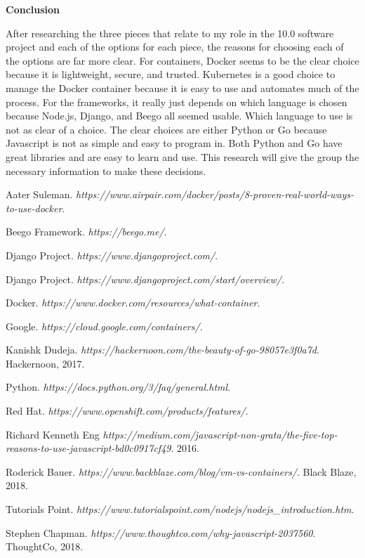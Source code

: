 \documentclass[letterpaper,10pt,draftclsnofoot,onecolumn,]{IEEEtran}
\begin{document}
\begin{center}
\textbf{Conclusion}\\
\end{center}
After researching the three pieces that relate to my role in the 10.0 software project and each of the options for each piece, the reasons for choosing each of the options are far more clear. For containers, Docker seems to be the clear choice because it is lightweight, secure, and trusted. Kubernetes is a good choice to manage the Docker container because it is easy to use and automates much of the process. For the frameworks, it really just depends on which language is chosen because Node.js, Django, and Beego all seemed usable. Which language to use is not as clear of a choice. The clear choices are either Python or Go because Javascript is not as simple and easy to program in. Both Python and Go have great libraries and are easy to learn and use. This research will give the group the necessary information to make these decisions.\\

\pagebreak
\begin{thebibliography}{9}

Aater Suleman.
\textit{https://www.airpair.com/docker/posts/8-proven-real-world-ways-to-use-docker}. 

Beego Framework.
\textit{https://beego.me/}.

Django Project.
\textit{https://www.djangoproject.com/}. 

Django Project.
\textit{https://www.djangoproject.com/start/overview/}. 

Docker. 
\textit{https://www.docker.com/resources/what-container}. 

Google.
\textit{https://cloud.google.com/containers/}.

Kanishk Dudeja.
\textit{https://hackernoon.com/the-beauty-of-go-98057e3f0a7d}.
Hackernoon, 2017.

Python.
\textit{https://docs.python.org/3/faq/general.html}.

Red Hat.
\textit{https://www.openshift.com/products/features/}.

Richard Kenneth Eng
\textit{https://medium.com/javascript-non-grata/the-five-top-reasons-to-use-javascript-bd0c0917cf49}.
2016.

Roderick Bauer. 
\textit{https://www.backblaze.com/blog/vm-vs-containers/}. 
Black Blaze, 2018.

Tutorials Point.
\textit{https://www.tutorialspoint.com/nodejs/nodejs_introduction.htm}.

Stephen Chapman.
\textit{https://www.thoughtco.com/why-javascript-2037560}.
ThoughtCo, 2018.


\end{thebibliography}
\end{document}
